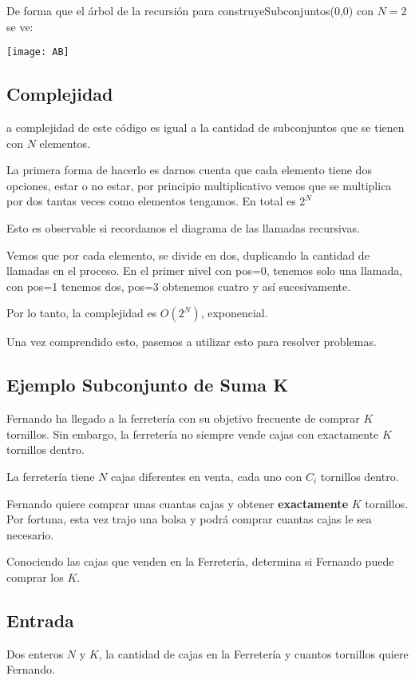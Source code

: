 De forma que el árbol de la recursión para construyeSubconjuntos(0,0) con \(N=2\) se ve:

\begin{center}
	\texttt{[image: AB]}
\end{center} 

\subsection{Complejidad}

a complejidad de este código es igual a la cantidad de subconjuntos que se tienen con \(N\) elementos.

La primera forma de hacerlo es darnos cuenta que cada elemento tiene dos opciones, estar o no estar, por principio multiplicativo vemos que se multiplica por dos tantas veces como elementos tengamos. En total es \(2^N\) 

Esto es observable si recordamos el diagrama de las llamadas recursivas.

Vemos que por cada elemento, se divide en dos, duplicando la cantidad de llamadas en el proceso. En el primer nivel con pos=0, tenemos solo una llamada, con pos=1 tenemos dos, pos=3 obtenemos cuatro y así sucesivamente.

Por lo tanto, la complejidad es \(O(2^N)\), exponencial.

Una vez comprendido esto, pasemos a utilizar esto para resolver problemas.

\subsection{Ejemplo Subconjunto de Suma K}
Fernando ha llegado a la ferretería con su objetivo frecuente de comprar \(K\) tornillos.  Sin embargo, la ferretería no siempre vende cajas con exactamente \(K\) tornillos dentro.

La ferretería tiene \(N\) cajas diferentes en venta, cada uno con \(C_i\) tornillos dentro.

Fernando quiere comprar unas cuantas cajas y obtener \textbf{exactamente} \(K\) tornillos. Por fortuna, esta vez trajo una bolsa y podrá comprar cuantas cajas le sea necesario.

Conociendo las cajas que venden en la Ferretería, determina si Fernando puede comprar los \(K\).

\subsection*{Entrada}
Dos enteros \(N\) y \(K\), la cantidad de cajas en la Ferretería y cuantos tornillos quiere Fernando.

